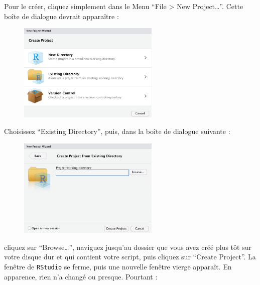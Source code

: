 \documentclass[
  letterpaper,
  DIV=11,
  numbers=noendperiod]{scrreprt}
\begin{document}
Pour le créer, cliquez simplement dans le Menu ``File \textgreater{} New
Project\ldots{}''. Cette boîte de dialogue devrait apparaître :

\begin{figure}

{\centering \includegraphics[width=0.6\textwidth,height=\textheight]{./images/Rproj1.png}

}

\end{figure}

Choisissez ``Existing Directory'', puis, dans la boîte de dialogue
suivante :

\begin{figure}

{\centering \includegraphics[width=0.6\textwidth,height=\textheight]{./images/Rproj2.png}

}

\end{figure}

cliquez sur ``Browse\ldots{}'', naviguez jusqu'au dossier que vous avez
créé plus tôt sur votre disque dur et qui contient votre script, puis
cliquez sur ``Create Project''. La fenêtre de \texttt{RStudio} se ferme,
puis une nouvelle fenêtre vierge apparaît. En apparence, rien n'a changé
ou presque. Pourtant :
\end{document}
